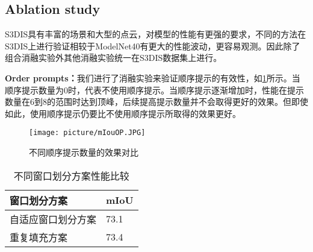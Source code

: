 \documentclass[preprint,12pt]{elsarticle}
\begin{document}
\subsection{Ablation study}
S3DIS具有丰富的场景和大型的点云，对模型的性能有更强的要求，不同的方法在S3DIS上进行验证相较于ModelNet40有更大的性能波动，更容易观测。因此除了组合消融实验外其他消融实验统一在S3DIS数据集上进行。

\label{subsec:Ablation}
\textbf{Order prompts：}我们进行了消融实验来验证顺序提示的有效性，如\cref{fig:mIouOP}所示。当顺序提示数量为0时，代表不使用顺序提示。当顺序提示逐渐增加时，性能在提示数量在6到8的范围时达到顶峰，后续提高提示数量并不会取得更好的效果。但即使如此，使用顺序提示仍要比不使用顺序提示所取得的效果更好。

\begin{figure}[htbp]
	\centering
	\texttt{[image: picture/mIouOP.JPG]}
	\caption{不同顺序提示数量的效果对比}
	\label{fig:mIouOP}
\end{figure}
\begin{table}[htbp!]
	\centering
	\begin{comment}
	\begin{minipage}[t]{0.4\textwidth}
		\centering
		\caption{不同顺序提示数量的效果}
		\label{tab:op}    
		\begin{tabular}{@{}ll@{}}
			\toprule
			\textbf{提示数量} & \textbf{mIoU} \\ \midrule
			0             & 72.5          \\
			2             & 72.9          \\
			4             & 73.1          \\
			6             & 73.4          \\
			8             & 73.4          \\
			10            & 73.3         \\ \bottomrule
		\end{tabular}
	\end{minipage}%
	\end{comment}
	\hspace{0.04\textwidth} %
	\begin{minipage}[t]{0.4\textwidth}
		\centering
		\caption{不同窗口划分方案性能比较}
		\label{tab:window}    
		\begin{tabular}{@{}ll@{}}
			\toprule
			窗口划分方案    & mIoU \\ \midrule
			自适应窗口划分方案 & 73.1 \\
			重复填充方案    & 73.4 \\ \bottomrule
		\end{tabular}
	\end{minipage}
\end{table}
\end{document}
